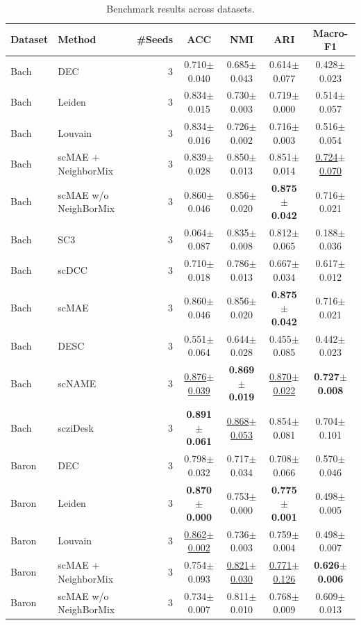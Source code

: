 \begin{table}[t]
\centering
\small
\caption{Benchmark results across datasets.}
\label{tab:benchmark\_main}
\begin{tabular}{llrcccc}
\toprule
Dataset & Method & \#Seeds & ACC & NMI & ARI & Macro-F1 \\
\midrule
Bach & DEC & 3 & 0.710$\pm$0.040 & 0.685$\pm$0.043 & 0.614$\pm$0.077 & 0.428$\pm$0.023 \\
Bach & Leiden & 3 & 0.834$\pm$0.015 & 0.730$\pm$0.003 & 0.719$\pm$0.000 & 0.514$\pm$0.057 \\
Bach & Louvain & 3 & 0.834$\pm$0.016 & 0.726$\pm$0.002 & 0.716$\pm$0.003 & 0.516$\pm$0.054 \\
Bach & scMAE + NeighborMix & 3 & 0.839$\pm$0.028 & 0.850$\pm$0.013 & 0.851$\pm$0.014 & \underline{0.724$\pm$0.070} \\
Bach & scMAE w/o NeighBorMix & 3 & 0.860$\pm$0.046 & 0.856$\pm$0.020 & \textbf{0.875$\pm$0.042} & 0.716$\pm$0.021 \\
Bach & SC3 & 3 & 0.064$\pm$0.087 & 0.835$\pm$0.008 & 0.812$\pm$0.065 & 0.188$\pm$0.036 \\
Bach & scDCC & 3 & 0.710$\pm$0.018 & 0.786$\pm$0.013 & 0.667$\pm$0.034 & 0.617$\pm$0.012 \\
Bach & scMAE & 3 & 0.860$\pm$0.046 & 0.856$\pm$0.020 & \textbf{0.875$\pm$0.042} & 0.716$\pm$0.021 \\
Bach & DESC & 3 & 0.551$\pm$0.064 & 0.644$\pm$0.028 & 0.455$\pm$0.085 & 0.442$\pm$0.023 \\
Bach & scNAME & 3 & \underline{0.876$\pm$0.039} & \textbf{0.869$\pm$0.019} & \underline{0.870$\pm$0.022} & \textbf{0.727$\pm$0.008} \\
Bach & scziDesk & 3 & \textbf{0.891$\pm$0.061} & \underline{0.868$\pm$0.053} & 0.854$\pm$0.081 & 0.704$\pm$0.101 \\
\midrule
Baron & DEC & 3 & 0.798$\pm$0.032 & 0.717$\pm$0.034 & 0.708$\pm$0.066 & 0.570$\pm$0.046 \\
Baron & Leiden & 3 & \textbf{0.870$\pm$0.000} & 0.753$\pm$0.000 & \textbf{0.775$\pm$0.001} & 0.498$\pm$0.005 \\
Baron & Louvain & 3 & \underline{0.862$\pm$0.002} & 0.736$\pm$0.003 & 0.759$\pm$0.004 & 0.498$\pm$0.007 \\
Baron & scMAE + NeighborMix & 3 & 0.754$\pm$0.093 & \underline{0.821$\pm$0.030} & \underline{0.771$\pm$0.126} & \textbf{0.626$\pm$0.006} \\
Baron & scMAE w/o NeighBorMix & 3 & 0.734$\pm$0.007 & 0.811$\pm$0.010 & 0.768$\pm$0.009 & 0.609$\pm$0.013 \\

\end{tabular}
\end{table}
